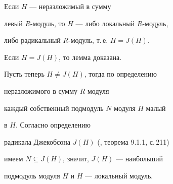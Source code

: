 




\begin{lems}


Если $H$ --- неразложимый в сумму 


левый $R$-модуль, то $H$ --- либо локальный $R$-модуль,


либо радикальный $R$-модуль, т.\,е. $H=J(H)$.


\end{lems}





\begin{pf}


Если $H=J(H)$, то лемма доказана.


Пусть теперь $H \not = J(H)$, тогда по определению


неразложимого в сумму $R$-модуля


каждый собственный подмодуль $N$ модуля $H$ малый 


в $H$. Согласно определению


радикала Джекобсона $J(H)$ (\cite{kasch}, теорема 9.1.1, с.\,211) 


имеем $N \subseteq J(H)$, значит, $J(H)$ --- наибольший 


подмодуль модуля $H$ и $H$ --- локальный модуль.


\end{pf}





